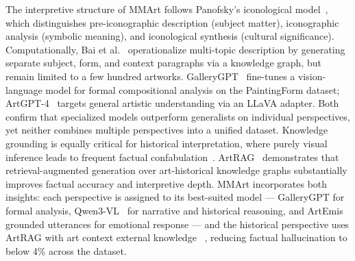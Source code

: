 The interpretive structure of MMArt follows Panofsky's iconological model~\cite{panofsky1955meaning}, which distinguishes pre-iconographic description (subject matter), iconographic analysis (symbolic meaning), and iconological synthesis (cultural significance).
Computationally, Bai et al.~\cite{Bai2021ExplainMT} operationalize multi-topic description by generating separate subject, form, and context paragraphs via a knowledge graph, but remain limited to a few hundred artworks.
GalleryGPT~\cite{MM24GalleryGPT} fine-tunes a vision-language model for formal compositional analysis on the PaintingForm dataset; ArtGPT-4~\cite{Yuan2023ArtGPT4TA} targets general artistic understanding via an LLaVA adapter.
Both confirm that specialized models outperform generalists on individual perspectives, yet neither combines multiple perspectives into a unified dataset.
Knowledge grounding is equally critical for historical interpretation, where purely visual inference leads to frequent factual confabulation~\cite{llm_Hallucination_2023}.
ArtRAG~\cite{ArtRAG_MM2025} demonstrates that retrieval-augmented generation over art-historical knowledge graphs substantially improves factual accuracy and interpretive depth.
MMArt incorporates both insights: each perspective is assigned to its best-suited model --- GalleryGPT for formal analysis, Qwen3-VL~\cite{bai2025qwen3vltechnicalreport} for narrative and historical reasoning,  and ArtEmis grounded utterances for emotional response --- and the historical perspective uses ArtRAG with art context external knowledge ~\cite{ArtRAG_MM2025}, reducing factual hallucination to below 4\% across the dataset.
